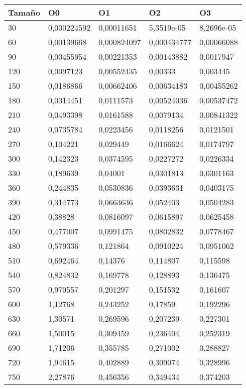 \begin{tabular}{|l|l|l|l|l|}
	\hline
	Tamaño & O0 & O1 & O2 & O3 \\
	\hline
	\hline
	30 & 0,000224592 & 0,00011651 & 5,3519e-05 & 8,2696e-05 \\
	\hline
	60 & 0,00139668 & 0,000824097 & 0,000434777 & 0,00066088 \\
	\hline
	90 & 0,00455954 & 0,00221353 & 0,00143882 & 0,0017947 \\
	\hline
	120 & 0,0097123 & 0,00552435 & 0,00333 & 0,003445 \\
	\hline
	150 & 0,0186866 & 0,00662406 & 0,00634183 & 0,00455262 \\
	\hline
	180 & 0,0314451 & 0,0111573 & 0,00524036 & 0,00537472 \\
	\hline
	210 & 0,0493398 & 0,0161588 & 0,0079134 & 0,00841322 \\
	\hline
	240 & 0,0735784 & 0,0223456 & 0,0118256 & 0,0121501 \\
	\hline
	270 & 0,104221 & 0,029449 & 0,0166624 & 0,0174797 \\
	\hline
	300 & 0,142323 & 0,0374595 & 0,0227272 & 0,0226334 \\
	\hline
	330 & 0,189639 & 0,04001 & 0,0301813 & 0,0301163 \\
	\hline
	360 & 0,244835 & 0,0530836 & 0,0393631 & 0,0403175 \\
	\hline
	390 & 0,314773 & 0,0663636 & 0,052403 & 0,0504283 \\
	\hline
	420 & 0,38828 & 0,0816097 & 0,0615897 & 0,0625458 \\
	\hline
	450 & 0,477007 & 0,0991475 & 0,0802832 & 0,0778467 \\
	\hline
	480 & 0,579336 & 0,121864 & 0,0910224 & 0,0951062 \\
	\hline
	510 & 0,692464 & 0,14376 & 0,114807 & 0,115598 \\
	\hline
	540 & 0,824832 & 0,169778 & 0,128893 & 0,136475 \\
	\hline
	570 & 0,970557 & 0,201297 & 0,151532 & 0,161607 \\
	\hline
	600 & 1,12768 & 0,243252 & 0,17859 & 0,192296 \\
	\hline
	630 & 1,30571 & 0,269596 & 0,207239 & 0,227301 \\
	\hline
	660 & 1,50015 & 0,309459 & 0,236404 & 0,252319 \\
	\hline
	690 & 1,71206 & 0,355785 & 0,271002 & 0,288827 \\
	\hline
	720 & 1,94615 & 0,402889 & 0,309074 & 0,328996 \\
	\hline
	750 & 2,27876 & 0,456356 & 0,349434 & 0,374203 \\
	\hline
\end{tabular}
